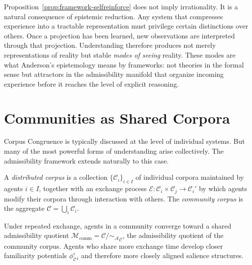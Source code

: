 \documentclass[12pt, a4paper, oneside]{book}
\newcommand{\Adm}{\mathcal{A}}
\newcommand{\M}{\mathcal{M}}
\newcommand{\C}{\mathcal{C}}
\newcommand{\SA}{{\sim_{\!\Adm}}}
\newcommand{\phiCe}{\phi_{\C}^{\varepsilon}}
\begin{document}
\begin{remark}
Proposition~\ref{prop:framework-selfreinforce} does not imply
irrationality. It is a natural consequence of epistemic reduction.
Any system that compresses experience into a tractable representation
must privilege certain distinctions over others. Once a projection has
been learned, new observations are interpreted through that projection.
Understanding therefore produces not merely representations of reality
but stable \emph{modes of seeing} reality. These modes are what
Anderson's epistemology means by frameworks: not theories in the
formal sense but attractors in the admissibility manifold that organize
incoming experience before it reaches the level of explicit reasoning.
\end{remark}

\section{Communities as Shared Corpora}
\label{sec:community-corpora}

Corpus Congruence is typically discussed at the level of individual
systems. But many of the most powerful forms of understanding arise
collectively. The admissibility framework extends naturally to this case.

\begin{definition}
\label{def:distributed-corpus}
A \emph{distributed corpus} is a collection $\{\C_i\}_{i \in I}$ of
individual corpora maintained by agents $i \in I$, together with an
exchange process $\mathcal{E} : \C_i \times \C_j \to \C_i'$ by which
agents modify their corpora through interaction with others.
The \emph{community corpus} is the aggregate $\C = \bigcup_i \C_i$.
\end{definition}

\begin{proposition}
\label{prop:community-manifold}
Under repeated exchange, agents in a community converge toward a
shared admissibility quotient $\M_{\mathrm{comm}} = \C/\SA_{\C}$,
the admissibility quotient of the community corpus. Agents who share
more exchange time develop closer familiarity potentials $\phiCe_i$
and therefore more closely aligned salience structures.
\end{proposition}
\end{document}
